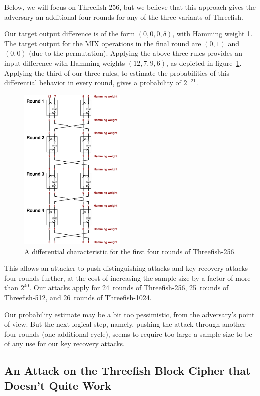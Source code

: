 \documentclass[11pt,twoside]{article}
\begin{document}
Below, we will focus on Threefish-256, but we believe that this approach gives the adversary an additional four rounds for any of the three variants of Threefish.

Our target output difference is of the form $(0,0,0,\delta)$, with Hamming weight 1. The target output for the MIX operations in the final round are $(0,1)$ and $(0,0)$ (due to the permutation). Applying the above three rules provides an input difference with Hamming weights $(12,7,9,6)$, as depicted in figure~\ref{fig:reverserounds256}. Applying the third of our three rules, to estimate the probabilities of this differential behavior in every round, gives a probability of $2^{-21}$.
%
\begin{figure}[htbp]
  \centering
   \includegraphics[width=0.45\textwidth]{reverserounds256.pdf}
  \caption{A differential characteristic for the first four rounds of
    Threefish-256.}
  \label{fig:reverserounds256}
\end{figure}

This allows an attacker to push distinguishing attacks and key recovery attacks four rounds further, at the cost of increasing the sample size by a factor of more than $2^{40}$. Our attacks apply for 24~rounds of Threefish-256, 25~rounds of Threefish-512, and 26~rounds of Threefish-1024.

Our probability estimate may be a bit too pessimistic, from the adversary's point of view. But the next logical step, namely, pushing the attack through another four rounds (one additional cycle), seems to require too large a sample size to be of any use for our key recovery attacks. 

\subsection{An Attack on the Threefish Block Cipher that Doesn't Quite Work} 
\end{document}
